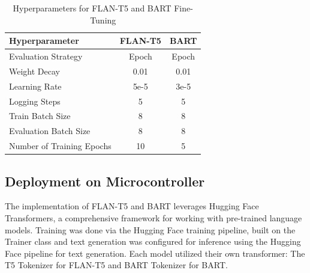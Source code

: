 \documentclass[conference]{IEEEtran}
\begin{document}
\begin{table}[!ht]
    \centering
    \caption{Hyperparameters for FLAN-T5 and BART Fine-Tuning}
    \label{tab:hyperparams}
    \begin{tabular}{l|c|c}
        \toprule
        \textbf{Hyperparameter}         & \textbf{FLAN-T5}         & \textbf{BART} \\
        \midrule
        Evaluation Strategy             & Epoch                   & Epoch                     \\ 
        Weight Decay                    & 0.01                    & 0.01                      \\ 
        Learning Rate                   & 5e-5                    & 3e-5                      \\ 
        Logging Steps                   & 5                       & 5                         \\ 
        Train Batch Size                & 8                       & 8                         \\ 
        Evaluation Batch Size           & 8                       & 8                         \\ 
        Number of Training Epochs       & 10                      & 5                         \\ 
        \bottomrule
    \end{tabular}
\end{table}

\subsection{Deployment on Microcontroller}
The implementation of FLAN-T5 and BART leverages Hugging Face Transformers, a comprehensive framework for working with pre-trained language models.
Training was done via the Hugging Face training pipeline, built on the Trainer class and text generation was configured for inference using the Hugging Face pipeline for text generation.
Each model utilized their own transformer: The T5 Tokenizer \cite{b10} for FLAN-T5 and BART Tokenizer \cite{b11} for BART.


\end{document}
